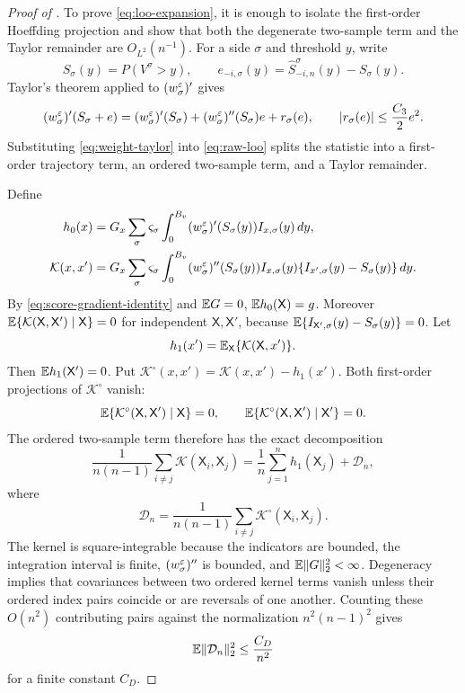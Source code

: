 \begin{proof}[Proof of ]
To prove \eqref{eq:loo-expansion}, it is enough to isolate the first-order Hoeffding projection and show that both the degenerate two-sample term and the Taylor remainder are $O_{L^2}(n^{-1})$.  For a side $\sigma$ and threshold $y$, write
\[
 S_\sigma(y)=P(V^\sigma>y),
 \qquad
 e_{-i,\sigma}(y)=\widehat S_{-i,n}^\sigma(y)-S_\sigma(y).
\]
Taylor's theorem applied to $(w_\sigma^\varepsilon)'$ gives
\begin{equation}\label{eq:weight-taylor}
 (w_\sigma^\varepsilon)'(S_\sigma+e)
 =(w_\sigma^\varepsilon)'(S_\sigma)
 +(w_\sigma^\varepsilon)''(S_\sigma)e
 +r_\sigma(e),
 \qquad
 \lvert r_\sigma(e)\rvert\le\frac{C_3}{2}e^2.
\end{equation}
Substituting \eqref{eq:weight-taylor} into \eqref{eq:raw-loo} splits the statistic into a first-order trajectory term, an ordered two-sample term, and a Taylor remainder.

Define
\begin{align*}
 h_0(x)
 &=G_x\sum_\sigma \varsigma_\sigma
 \int_0^{B_v}(w_\sigma^\varepsilon)'(S_\sigma(y))I_{x,\sigma}(y)\,dy,\\
 \mathcal K(x,x')
 &=G_x\sum_\sigma \varsigma_\sigma
 \int_0^{B_v}(w_\sigma^\varepsilon)''(S_\sigma(y))
 I_{x,\sigma}(y)\{I_{x',\sigma}(y)-S_\sigma(y)\}\,dy.
\end{align*}
By \eqref{eq:score-gradient-identity} and $\mathbb E G=0$, $\mathbb E h_0(\mathsf X)=g$.  Moreover
$\mathbb E\{\mathcal K(\mathsf X,\mathsf X')\mid \mathsf X\}=0$ for independent $\mathsf X,\mathsf X'$, because
$\mathbb E\{I_{\mathsf X',\sigma}(y)-S_\sigma(y)\}=0$.  Let
\[
 h_1(x')=\mathbb E_{\mathsf X}\{\mathcal K(\mathsf X,x')\}.
\]
Then $\mathbb E h_1(\mathsf X')=0$.  Put
$\mathcal K^\circ(x,x')=\mathcal K(x,x')-h_1(x')$.  Both first-order projections of $\mathcal K^\circ$ vanish:
\[
 \mathbb E\{\mathcal K^\circ(\mathsf X,\mathsf X')\mid \mathsf X\}=0,
 \qquad
 \mathbb E\{\mathcal K^\circ(\mathsf X,\mathsf X')\mid \mathsf X'\}=0.
\]
The ordered two-sample term therefore has the exact decomposition
\begin{equation}\label{eq:ordered-hoeffding}
 \frac{1}{n(n-1)}\sum_{i\ne j}\mathcal K(\mathsf X_i,\mathsf X_j)
 =\frac1n\sum_{j=1}^{n}h_1(\mathsf X_j)
 +\mathcal D_n,
\end{equation}
where
\[
 \mathcal D_n=\frac{1}{n(n-1)}\sum_{i\ne j}\mathcal K^\circ(\mathsf X_i,\mathsf X_j).
\]
The kernel is square-integrable because the indicators are bounded, the integration interval is finite, $(w_\sigma^\varepsilon)''$ is bounded, and $\mathbb E\lVert G\rVert_2^2<\infty$.  Degeneracy implies that covariances between two ordered kernel terms vanish unless their ordered index pairs coincide or are reversals of one another.  Counting these $O(n^2)$ contributing pairs against the normalization $n^2(n-1)^2$ gives
\begin{equation}\label{eq:degenerate-remainder}
 \mathbb E\lVert\mathcal D_n\rVert_2^2\le\frac{C_D}{n^2}
\end{equation}
for a finite constant $C_D$.


\end{proof}
